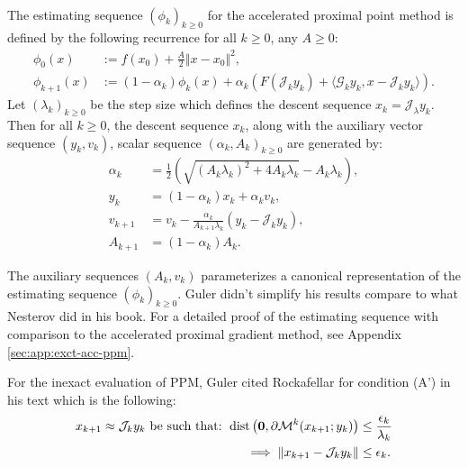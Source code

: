 \documentclass[12pt]{article}
\begin{document}
    \begin{definition}\label{def:nes-est-seq-acc-ppm}
        \; \\
        The estimating sequence  $(\phi_k)_{k \ge0}$ for the accelerated proximal point method is defined by the following recurrence for all $k \ge0$, any $A \ge 0$: 
        \begin{align*}
            \phi_0(x) &:= f(x_0) + \frac{A}{2}\Vert x - x_0\Vert^2, 
            \\
            \phi_{k + 1}(x) &:= 
            (1 - \alpha_k)\phi_k(x)
            + 
            \alpha_k(F(\mathcal J_k y_k) + \langle \mathcal G_k y_k, x - \mathcal J_k y_k\rangle).    
        \end{align*}
        Let $(\lambda_k)_{k \ge 0}$ be the step size which defines the descent sequence $x_k = \mathcal J_\lambda y_k$. 
        Then for all $k \ge 0$, the descent sequence $x_k$, along with the auxiliary vector sequence $(y_k, v_k)$, scalar sequence $(\alpha_k, A_k)_{k\ge 0}$ are generated by: 
        \begin{align*}
            \alpha_k &= \frac{1}{2}\left(
                \sqrt{(A_k\lambda_k)^2 + 4A_k \lambda_k}
                - A_k\lambda_k
            \right), 
            \\
            y_k &= (1 - \alpha_k)x_k + \alpha_k v_k, 
            \\
            v_{k + 1}
            &= 
            v_k - \frac{\alpha_k}{A_{k + 1}\lambda_k}(y_k - \mathcal J_k y_k), 
            \\
            A_{k + 1} &= (1 - \alpha_k)A_k. 
        \end{align*}
    \end{definition}
    \begin{remark}
        The auxiliary sequences $(A_k, v_k)$ parameterizes a canonical representation of the estimating sequence $(\phi_k)_{k \ge0}$. 
        Guler didn't simplify his results compare to what Nesterov did in his book. 
        For a detailed proof of the estimating sequence with comparison to the accelerated proximal gradient method, see Appendix \ref*{sec:app:exct-acc-ppm}. 
    \end{remark}
    For the inexact evaluation of PPM, Guler cited Rockafellar \cite{rockafellar_monotone_1976} for condition (A') in his text which is the following: 
    \begin{align*}
        x_{k + 1}\approx \mathcal J_{k} y_k \text{ be such that: }
        \operatorname{dist}\left(
            \mathbf 0, \partial \mathcal M^{k}(x_{k + 1}; y_k)
        \right) &\le \frac{\epsilon_k}{\lambda_k}
        \\
        \implies 
        \Vert x_{k + 1} - \mathcal J_{k}y_k\Vert 
        &\le \epsilon_k. 
    \end{align*}
\end{document}
